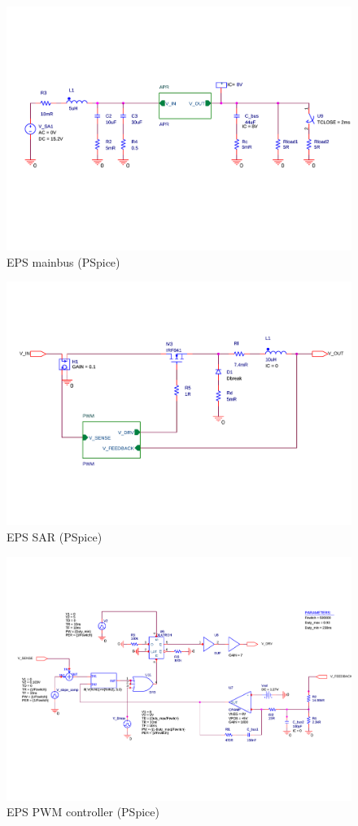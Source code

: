 \begin{figure}
\centering
\includegraphics[scale=0.6]{figures/fig_CDR_PSpice_Mainbus}
\caption{EPS mainbus (PSpice)}
\label{fig:PSpice_mainbus}
\end{figure}
%
\begin{figure}
\centering
\includegraphics[scale=0.6]{figures/fig_CDR_PSpice_APR}
\caption{EPS SAR (PSpice)}
\label{fig:PSpice_SAR}
\end{figure}
%
\begin{figure}
\centering
\includegraphics[scale=0.8]{figures/fig_CDR_PSpice_PWM}
\caption{EPS PWM controller (PSpice)}
\label{fig:PSpice_PWM}
\end{figure}
